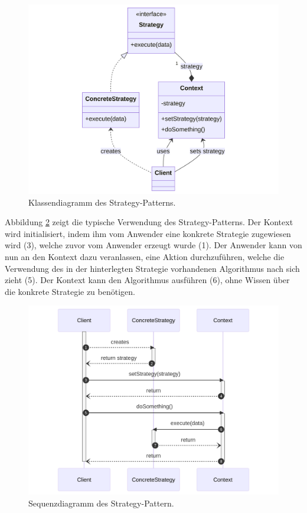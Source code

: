 \begin{figure}[H]
	\centering
	\includegraphics[width=0.75\linewidth]{images/patterns/strategy-class.png}
	\caption{Klassendiagramm des Strategy-Patterns. \cite{skobeleva_strategy_2023}}
	\label{fig:strategy-class}
\end{figure}

Abbildung \ref{fig:strategy-seq} zeigt die typische Verwendung des Strategy-Patterns. Der Kontext wird initialisiert, indem ihm vom Anwender eine konkrete Strategie zugewiesen wird (3), welche zuvor vom Anwender erzeugt wurde (1). Der Anwender kann von nun an den Kontext dazu veranlassen, eine Aktion durchzuführen, welche die Verwendung des in der hinterlegten Strategie vorhandenen Algorithmus nach sich zieht (5). Der Kontext kann den Algorithmus ausführen (6), ohne Wissen über die konkrete Strategie zu benötigen.

\begin{figure}[H]
	\centering
	\includegraphics[width=0.75\linewidth]{images/patterns/strategy-seq.png}
	\caption{Sequenzdiagramm des Strategy-Pattern. \cite{skobeleva_strategy_2023}}
	\label{fig:strategy-seq}
\end{figure}

